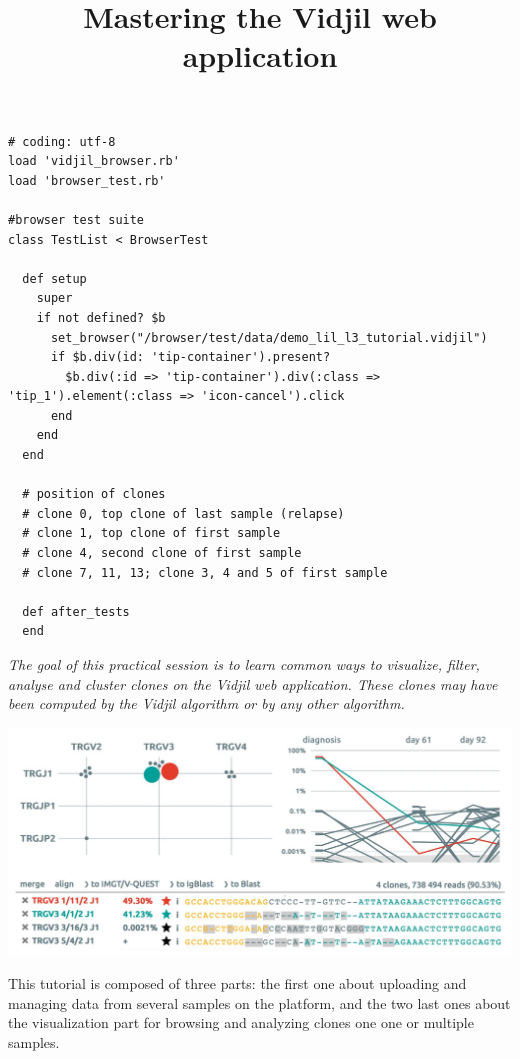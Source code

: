 \documentclass[11pt]{report}
\title{Mastering the Vidjil web application
}
\begin{document}
\begin{verbatim}
# coding: utf-8
load 'vidjil_browser.rb'
load 'browser_test.rb'

#browser test suite
class TestList < BrowserTest

  def setup
    super
    if not defined? $b
      set_browser("/browser/test/data/demo_lil_l3_tutorial.vidjil")
      if $b.div(id: 'tip-container').present?
        $b.div(:id => 'tip-container').div(:class => 'tip_1').element(:class => 'icon-cancel').click
      end
    end
  end

  # position of clones
  # clone 0, top clone of last sample (relapse)
  # clone 1, top clone of first sample
  # clone 4, second clone of first sample
  # clone 7, 11, 13; clone 3, 4 and 5 of first sample

  def after_tests
  end
\end{verbatim}


\maketitle

\textit{The goal of this practical session is to learn
common ways to visualize, filter, analyse and cluster clones
on the Vidjil web application.
%
These clones may have been computed by the Vidjil algorithm
or by any other algorithm.}

\bigskip


\centerline{\includegraphics[width=\textwidth]{vidjil-combined.jpg}}

\bigskip

This tutorial is composed of three parts:
the first one about uploading and managing data from several samples on the platform,
and the two last ones about the visualization
part for browsing and analyzing clones one one
or multiple samples.
\end{document}

